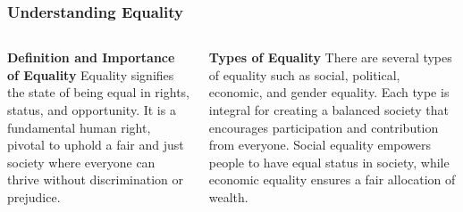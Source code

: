\documentclass[5pt]{beamer}
\begin{document}
\begin{frame}
\frametitle{Understanding Equality}
\begin{columns}
\begin{column}{0.45\textwidth}
\begin{block}{\textbf{Definition and Importance of Equality}}
Equality signifies the state of being equal in rights, status, and opportunity. It is a fundamental human right, pivotal to uphold a fair and just society where everyone can thrive without discrimination or prejudice.
\end{block}
\end{column}
\begin{column}{0.45\textwidth}
\begin{block}{\textbf{Types of Equality}}
There are several types of equality such as social, political, economic, and gender equality. Each type is integral for creating a balanced society that encourages participation and contribution from everyone. Social equality empowers people to have equal status in society, while economic equality ensures a fair allocation of wealth.
\end{block}
\end{column}
\end{columns}
\end{frame}
\end{document}
